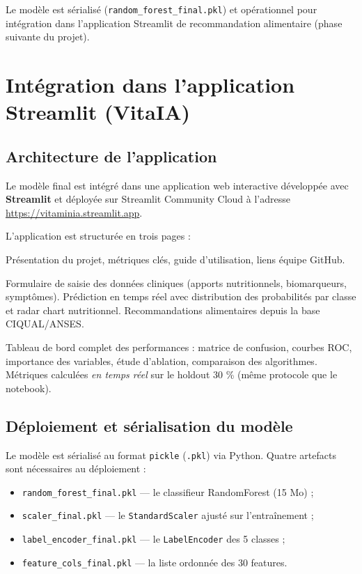 \documentclass[12pt,a4paper]{article}
\begin{document}
Le modèle est sérialisé (\texttt{random\_forest\_final.pkl}) et opérationnel pour
intégration dans l'application Streamlit de recommandation alimentaire (phase
suivante du projet).

\section{Intégration dans l'application Streamlit (VitaIA)}

\subsection{Architecture de l'application}

Le modèle final est intégré dans une application web interactive développée avec
\textbf{Streamlit} et déployée sur Streamlit Community Cloud à l'adresse
\url{https://vitaminia.streamlit.app}.

L'application est structurée en trois pages :

\begin{description}[leftmargin=2em]
    \item[Accueil (\texttt{app.py})] Présentation du projet, métriques clés,
        guide d'utilisation, liens équipe GitHub.
    \item[Diagnostic (\texttt{1\_Diagnostic.py})] Formulaire de saisie des données
        cliniques (apports nutritionnels, biomarqueurs, symptômes). Prédiction en
        temps réel avec distribution des probabilités par classe et radar chart
        nutritionnel. Recommandations alimentaires depuis la base CIQUAL/ANSES.
    \item[Résultats (\texttt{2\_Presentation.py})] Tableau de bord complet des
        performances : matrice de confusion, courbes ROC, importance des variables,
        étude d'ablation, comparaison des algorithmes. Métriques calculées
        \emph{en temps réel} sur le holdout 30 \% (même protocole que le notebook).
\end{description}

\subsection{Déploiement et sérialisation du modèle}

Le modèle est sérialisé au format \texttt{pickle} (\texttt{.pkl}) via Python.
Quatre artefacts sont nécessaires au déploiement :
\begin{itemize}[leftmargin=2em]
    \item \texttt{random\_forest\_final.pkl} — le classifieur RandomForest (15 Mo) ;
    \item \texttt{scaler\_final.pkl} — le \texttt{StandardScaler} ajusté sur l'entraînement ;
    \item \texttt{label\_encoder\_final.pkl} — le \texttt{LabelEncoder} des 5 classes ;
    \item \texttt{feature\_cols\_final.pkl} — la liste ordonnée des 30 features.
\end{itemize}
\end{document}
